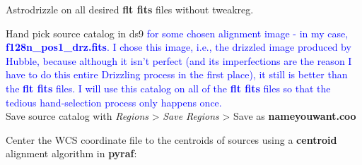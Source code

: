 \documentclass[11pt,obeyspaces]{article} %
\begin{document}
\begin{oframed}
\begin{enumerate}
{\sf \item Astrodrizzle on all desired {\bf flt fits} files without tweakreg. 
\item Hand pick source catalog in ds9 \textcolor{blue}{for some chosen alignment image - in my case, {\bf f128n\_pos1\_drz.fits}. I chose this image, i.e., the drizzled image produced by Hubble, because although it isn't perfect (and its imperfections are the reason I have to do this entire Drizzling process in the first place), it still is better than the {\bf flt fits} files. I will use this catalog on all of the {\bf flt fits} files so that the tedious hand-selection process only happens once. } \\
Save source catalog with {\it Regions} > {\it Save Regions} > Save as {\bf nameyouwant.coo}  
\item \color{blue} Center the WCS coordinate file to the centroids of sources using a {\bf centroid} alignment algorithm in {\bf pyraf}: \\
\color{black}  \\

}
\end{enumerate}
\end{oframed}
\end{document}
